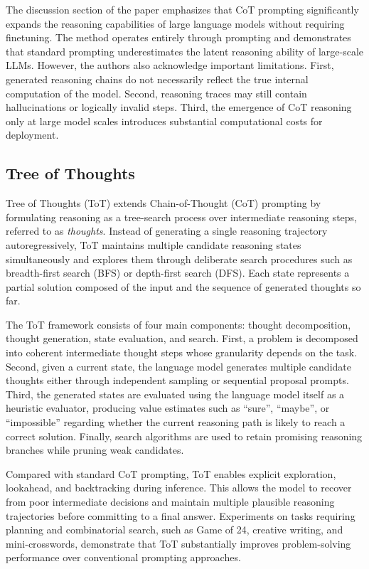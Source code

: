 The discussion section of the paper emphasizes that CoT prompting significantly expands the reasoning capabilities of large language models without requiring finetuning. The method operates entirely through prompting and demonstrates that standard prompting underestimates the latent reasoning ability of large-scale LLMs. However, the authors also acknowledge important limitations. First, generated reasoning chains do not necessarily reflect the true internal computation of the model. Second, reasoning traces may still contain hallucinations or logically invalid steps. Third, the emergence of CoT reasoning only at large model scales introduces substantial computational costs for deployment.


\subsection{Tree of Thoughts}

Tree of Thoughts (ToT) extends Chain-of-Thought (CoT) prompting by formulating reasoning as a tree-search process over intermediate reasoning steps, referred to as \emph{thoughts}. 
Instead of generating a single reasoning trajectory autoregressively, ToT maintains multiple candidate reasoning states simultaneously and explores them through deliberate search procedures such as breadth-first search (BFS) or depth-first search (DFS). 
Each state represents a partial solution composed of the input and the sequence of generated thoughts so far.

The ToT framework consists of four main components: thought decomposition, thought generation, state evaluation, and search. 
First, a problem is decomposed into coherent intermediate thought steps whose granularity depends on the task. 
Second, given a current state, the language model generates multiple candidate thoughts either through independent sampling or sequential proposal prompts. 
Third, the generated states are evaluated using the language model itself as a heuristic evaluator, producing value estimates such as ``sure'', ``maybe'', or ``impossible'' regarding whether the current reasoning path is likely to reach a correct solution. 
Finally, search algorithms are used to retain promising reasoning branches while pruning weak candidates.

Compared with standard CoT prompting, ToT enables explicit exploration, lookahead, and backtracking during inference. 
This allows the model to recover from poor intermediate decisions and maintain multiple plausible reasoning trajectories before committing to a final answer. 
Experiments on tasks requiring planning and combinatorial search, such as Game of 24, creative writing, and mini-crosswords, demonstrate that ToT substantially improves problem-solving performance over conventional prompting approaches.

